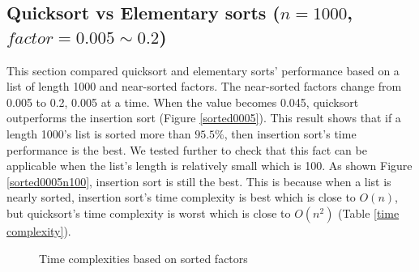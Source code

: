 \documentclass[12pt]{article}
\begin{document}
\subsection{Quicksort vs Elementary sorts ($n=1000$, $factor=0.005 \sim  0.2$)}
This section compared quicksort and elementary sorts' performance based on a list of length 1000 
and near-sorted factors. The near-sorted factors change from 0.005 to 0.2, 
0.005 at a time. When the value becomes 0.045, quicksort outperforms the insertion sort 
(Figure \ref{sorted0005}). This result shows that if a length 1000's list is sorted more 
than $95.5\%$, then insertion sort's time performance is the best.   
We tested further to check that this fact can be applicable when the list's length 
is relatively small which is 100. As shown Figure \ref{sorted0005n100},
insertion sort is still the best. This is because when a list is nearly
sorted, insertion sort's time complexity is best which is close to $O(n)$, 
but quicksort's time complexity is worst which is close to $O(n^{2})$
 (Table \ref{time complexity}).

 \bigskip

 \begin{figure}[hbt!]
  \centering
  \hfill
  \caption{Time complexities based on sorted factors}
\end{figure}

\bigskip
\end{document}
